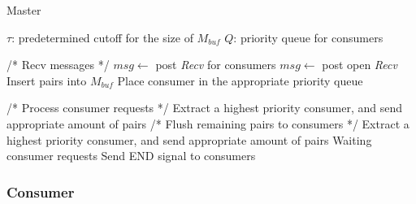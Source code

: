 \documentclass[10pt,journal,letterpaper,compsoc]{IEEEtran}
\begin{document}
\begin{algorithm}
\caption{Master}
\label{ms}
\begin{algorithmic}[1]

    \STATE $\tau$: predetermined cutoff for the size of $M_{buf}$
    \STATE $Q$: priority queue for consumers

    \WHILE{\TRUE}
        \STATE /* Recv messages */
            \STATE $msg\leftarrow$ post {\it Recv} for consumers
        \ELSE 
            \STATE $msg\leftarrow$ post open {\it Recv}
                \STATE Insert pairs into $M_{buf}$
                \ENDIF
                \STATE Place consumer in the appropriate priority queue
            \ENDIF
        \ENDIF
        
        \STATE /* Process consumer requests */
            \STATE Extract a highest priority consumer, and send appropriate amount of pairs
        \ENDWHILE
    \ENDWHILE
    \STATE /* Flush remaining pairs to consumers */
                \STATE Extract a highest priority consumer, and send appropriate amount of pairs
            \ELSE
                \STATE Waiting consumer requests
            \ENDIF
    \ENDWHILE
    \STATE Send END signal to consumers
\end{algorithmic}
\end{algorithm}



\subsubsection{Consumer}
\label{secConsumer}
\end{document}

